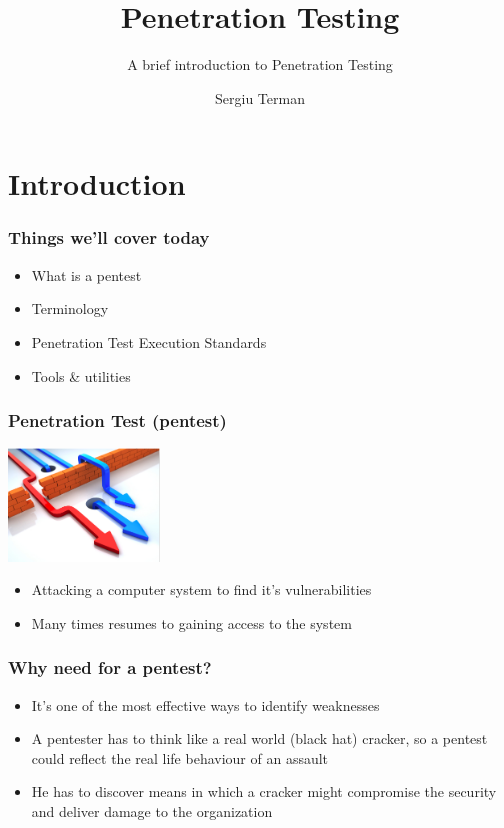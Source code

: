 \documentclass{beamer}
\title[Penetration Testing] %
{Penetration Testing}
\subtitle{A brief introduction to Penetration Testing}
\author[Sergiu Terman] %
{Sergiu Terman}
\institute[FIT CVUT] %
{CVUT}
\newcommand\ListFont{\fontsize{15}{30}\selectfont}
\begin{document}
\frame{\titlepage}

\section{Introduction}

\begin{frame}
	\frametitle{Things we'll cover today}
	\ListFont
	\begin{itemize}
		\item<2-> What is a pentest
		\item<3-> Terminology
		\item<4->Penetration Test Execution Standards
		\item<5> Tools \& utilities
	\end{itemize}
\end{frame}

\begin{frame}
	\frametitle{Penetration Test (pentest)}
	\begin{overprint}
		\begin{center}
		\includegraphics[height=3cm]{./pentest.png}
		\end{center}
	\end{overprint}

	\fontsize{15}{10}\selectfont
	\begin{alertblock}{}
		\begin{itemize} \itemsep4ex
		\item Attacking a computer system to find it’s vulnerabilities
		\item Many times resumes to gaining access to the system
		\end{itemize}
	\end{alertblock}
\end{frame}

\begin{frame}
	\frametitle{Why need for a pentest?}
	\fontsize{12}{15}\selectfont
	\begin{itemize} \itemsep4ex
	\item<2-> It’s one of the most effective ways to identify weaknesses
	\item<3-> A pentester has to think like a real world (black hat) cracker, so a pentest could reflect the \alert<4->{real life behaviour of an assault}
	\item<5> He has to discover means in which a cracker might compromise the security and deliver damage to the organization
	\end{itemize}
\end{frame}
\end{document}
